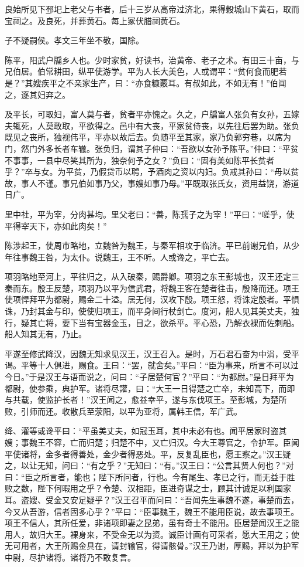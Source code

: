 \documentclass[]{article}
\begin{document}
良始所见下邳圯上老父与书者，后十三岁从高帝过济北，果得穀城山下黄石，取而宝祠之。及良死，并葬黄石。每上冢伏腊祠黄石。

子不疑嗣侯。孝文三年坐不敬，国除。

陈平，阳武户牖乡人也。少时家贫，好读书，治黄帝、老子之术。有田三十亩，与兄伯居。伯常耕田，纵平使游学。平为人长大美色，人或谓平：``贫何食而肥若是？''其嫂疾平之不亲家生产，曰：``亦食糠覈耳。有叔如此，不如无有！''伯闻之，逐其妇弃之。

及平长，可取妇，富人莫与者，贫者平亦愧之。久之，户牖富人张负有女孙，五嫁夫辄死，人莫敢取，平欲得之。邑中有大丧，平家贫侍丧，以先往后罢为助。张负既见之丧所，独视伟平，平亦以故后去。负随平至其家，家乃负郭穷巷，以席为门，然门外多长者车辙。张负归，谓其子仲曰：``吾欲以女孙予陈平。''仲曰：``平贫不事事，一县中尽笑其所为，独奈何予之女？''负曰：``固有美如陈平长贫者乎？''卒与女。为平贫，乃假贷币以聘，予酒肉之资以内妇。负戒其孙曰：``毋以贫故，事人不谨。事兄伯如事乃父，事嫂如事乃母。''平既取张氏女，资用益饶，游道日广。

里中社，平为宰，分肉甚均。里父老曰：``善，陈孺子之为宰！''平曰：``嗟乎，使平得宰天下，亦如此肉矣！''

陈涉起王，使周市略地，立魏咎为魏王，与秦军相攻于临济。平已前谢兄伯，从少年往事魏王咎，为太仆。说魏王，王不听。人或谗之，平亡去。

项羽略地至河上，平往归之，从入破秦，赐爵卿。项羽之东王彭城也，汉王还定三秦而东。殷王反楚，项羽乃以平为信武君，将魏王客在楚者往击，殷降而还。项王使项悍拜平为都尉，赐金二十溢。居无何，汉攻下殷。项王怒，将诛定殷者。平惧诛，乃封其金与印，使使归项王，而平身间行杖剑亡。度河，船人见其美丈夫，独行，疑其亡将，要下当有宝器金玉，目之，欲杀平。平心恐，乃解衣裸而佐刺船。船人知其无有，乃止。

平遂至修武降汉，因魏无知求见汉王，汉王召入。是时，万石君石奋为中涓，受平谒。平等十人俱进，赐食。王曰：``罢，就舍矣。''平曰：``臣为事来，所言不可以过今日。''于是汉王与语而说之，问曰：``子居楚何官？''平曰：``为都尉。''是日拜平为都尉，使参乘，典护军。诸将尽讙，曰：``大王一日得楚之亡卒，未知高下，而即与共载，使监护长者！''汉王闻之，愈益幸平，遂与东伐项王。至彭城，为楚所败，引师而还。收散兵至荥阳，以平为亚将，属韩王信，军广武。

绛、灌等或谗平曰：``平虽美丈夫，如冠玉耳，其中未必有也。闻平居家时盗其嫂；事魏王不容，亡而归楚；归楚不中，又亡归汉。今大王尊官之，令护军。臣闻平使诸将，金多者得善处，金少者得恶处。平，反复乱臣也，愿王察之。''汉王疑之，以让无知，问曰：``有之乎？''无知曰：``有。''汉王曰：``公言其贤人何也？''对曰：``臣之所言者，能也；陛下所问者，行也。今有尾生、孝已之行，而无益于胜败之数，陛下何暇用之乎？令楚、汉相距，臣进奇谋之士，顾其计诚足以利国家耳。盗嫂、受金又安足疑乎？''汉王召平而问曰：``吾闻先生事魏不遂，事楚而去，今又从吾游，信者固多心乎？''平曰：``臣事魏王，魏王不能用臣说，故去事项王。项王不信人，其所任爱，非诸项即妻之昆弟，虽有奇士不能用。臣居楚闻汉王之能用人，故归大王。裸身来，不受金无以为资。诚臣计画有可采者，愿大王用之；使无可用者，大王所赐金具在，请封输官，得请骸骨。''汉王乃谢，厚赐，拜以为护军中尉，尽护诸将。诸将乃不敢复言。
\end{document}
